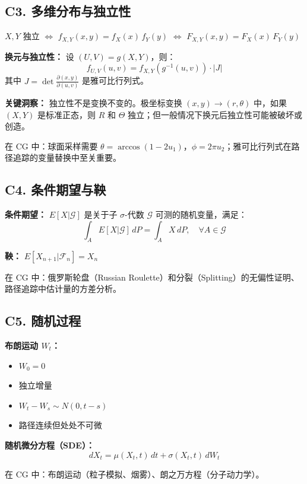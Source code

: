 \subsection{C3. 多维分布与独立性}

$X, Y$ 独立 $\iff$ $f_{X,Y}(x,y) = f_X(x)\,f_Y(y)$ $\iff$ $F_{X,Y}(x,y) = F_X(x)\,F_Y(y)$

\textbf{换元与独立性：} 设 $(U,V) = g(X,Y)$，则：
\[
f_{U,V}(u,v) = f_{X,Y}(g^{-1}(u,v)) \cdot |J|
\]
其中 $J = \det\frac{\partial(x,y)}{\partial(u,v)}$ 是雅可比行列式。

\textbf{关键洞察：} 独立性不是变换不变的。极坐标变换 $(x,y) \to (r,\theta)$ 中，如果 $(X,Y)$ 是标准正态，则 $R$ 和 $\Theta$ 独立；但一般情况下换元后独立性可能被破坏或创造。

在 CG 中：球面采样需要 $\theta = \arccos(1-2u_1)$，$\phi = 2\pi u_2$；雅可比行列式在路径追踪的变量替换中至关重要。

\subsection{C4. 条件期望与鞅}

\textbf{条件期望：} $E[X|\mathcal{G}]$ 是关于子 $\sigma$-代数 $\mathcal{G}$ 可测的随机变量，满足：
\[
\int_A E[X|\mathcal{G}]\,dP = \int_A X\,dP, \quad \forall A \in \mathcal{G}
\]

\textbf{鞅：} $E[X_{n+1}|\mathcal{F}_n] = X_n$

在 CG 中：俄罗斯轮盘（Russian Roulette）和分裂（Splitting）的无偏性证明、路径追踪中估计量的方差分析。

\subsection{C5. 随机过程}

\textbf{布朗运动 $W_t$：}
\begin{itemize}
  \item $W_0 = 0$
  \item 独立增量
  \item $W_t - W_s \sim N(0, t-s)$
  \item 路径连续但处处不可微
\end{itemize}

\textbf{随机微分方程（SDE）：}
\[
dX_t = \mu(X_t, t)\,dt + \sigma(X_t, t)\,dW_t
\]

在 CG 中：布朗运动（粒子模拟、烟雾）、朗之万方程（分子动力学）。